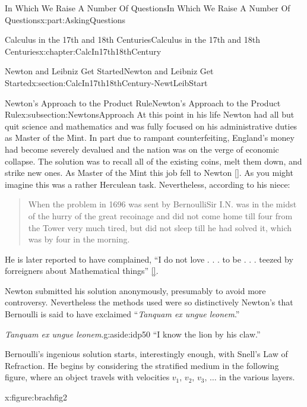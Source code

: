 \documentclass[oneside,10pt,]{book}
\newcommand{\xreffont}{\relax}
\numberwithin{equation}{section}
\begin{document}
\begin{partptx}{In Which We Raise A Number Of Questions}{}{In Which We Raise A Number Of Questions}{}{}{x:part:AskingQuestions}
\begin{chapterptx}{Calculus in the 17th and 18th Centuries}{}{Calculus in the 17th and 18th Centuries}{}{}{x:chapter:CalcIn17th18thCentury}
\begin{sectionptx}{Newton and Leibniz Get Started}{}{Newton and Leibniz Get Started}{}{}{x:section:CalcIn17th18thCentury-NewtLeibStart}
\begin{subsectionptx}{Newton's Approach to the Product Rule}{}{Newton's Approach to the Product Rule}{}{}{x:subsection:NewtonsApproach}
At this point in his life Newton had all but quit science and mathematics and was fully focused on his administrative duties as Master of the Mint.  In part due to rampant counterfeiting, England's money had become severely devalued and the nation was on the verge of economic collapse.  The solution was to recall all of the existing coins, melt them down, and strike new ones.  As Master of the Mint this job fell to Newton \hyperlink{x:biblio:levenson09__newton_count}{[{\xreffont 8}]}.  As you might imagine this was a rather Herculean task.  Nevertheless, according to his niece:%
\begin{quote}%
When the problem in 1696 was sent by Bernoulli\textendash{}Sir I.N. was in the midst of the hurry of the great recoinage and did not come home till four from the Tower very much tired, but did not sleep till he had solved it, which was by four in the morning.%
\end{quote}
He is later reported to have complained, ``I do not love . . . to be . . . teezed by forreigners about Mathematical things'' \hyperlink{x:biblio:dunham90__journ_throug_genius}{[{\xreffont 2}]}.%
\par
{} Newton submitted his solution anonymously, presumably to avoid more controversy.  Nevertheless the methods used were so distinctively Newton's that Bernoulli is said to have exclaimed ``\textit{Tanquam ex ungue leonem}.''%
\begin{aside}{\textit{Tanquam ex ungue leonem}.}{g:aside:idp50}%
``I know the lion by his claw.''%
\end{aside}
 Bernoulli's ingenious solution starts, interestingly enough, with Snell's Law of Refraction. He begins by considering the stratified medium in the following figure, where an object travels with velocities \(v_1,\,v_2,\,v_3,\,\ldots\) in the various layers.%
\begin{figureptx}{}{x:figure:brachfig2}{}%
\begin{image}{0.125}{0.75}{0.125}%

\end{image}
\end{figureptx}
\end{subsectionptx}
\end{sectionptx}
\end{chapterptx}
\end{partptx}
\end{document}
